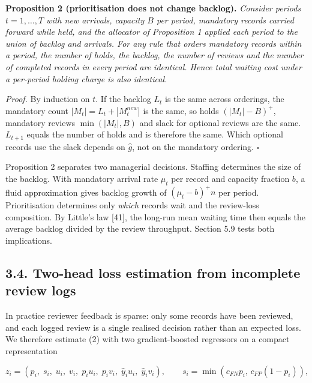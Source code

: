\documentclass[
  11pt,
]{article}
\begin{document}
\textbf{Proposition 2 (prioritisation does not change backlog).}
\emph{Consider periods \(t=1,\dots,T\) with new arrivals, capacity \(B\)
per period, mandatory records carried forward while held, and the
allocator of Proposition 1 applied each period to the union of backlog
and arrivals. For any rule that orders mandatory records within a
period, the number of holds, the backlog, the number of reviews and the
number of completed records in every period are identical. Hence total
waiting cost under a per-period holding charge is also identical.}

\emph{Proof.} By induction on \(t\). If the backlog \(L_t\) is the same
across orderings, the mandatory count \(|M_t| = L_t + |M^{new}_t|\) is
the same, so holds \((|M_t|-B)^+\), mandatory reviews \(\min(|M_t|,B)\)
and slack for optional reviews are the same. \(L_{t+1}\) equals the
number of holds and is therefore the same. Which optional records use
the slack depends on \(\hat g\), not on the mandatory ordering.
\(\square\)

Proposition 2 separates two managerial decisions. Staffing determines
the size of the backlog. With mandatory arrival rate \(\mu_t\) per
record and capacity fraction \(b\), a fluid approximation gives backlog
growth of \((\mu_t-b)^+ n\) per period. Prioritisation determines only
\emph{which} records wait and the review-loss composition. By Little's
law {[}41{]}, the long-run mean waiting time then equals the average
backlog divided by the review throughput. Section 5.9 tests both
implications.

\hypertarget{two-head-loss-estimation-from-incomplete-review-logs}{%
\subsection{3.4. Two-head loss estimation from incomplete review
logs}\label{two-head-loss-estimation-from-incomplete-review-logs}}

In practice reviewer feedback is sparse: only some records have been
reviewed, and each logged review is a single realised decision rather
than an expected loss. We therefore estimate (2) with two
gradient-boosted regressors on a compact representation

\[z_i = (p_i,\; s_i,\; u_i,\; v_i,\; p_iu_i,\; p_iv_i,\; \hat y_iu_i,\; \hat y_iv_i), \qquad s_i=\min(c_{FN}p_i,\, c_{FP}(1-p_i)), \tag{5}\]
\end{document}
